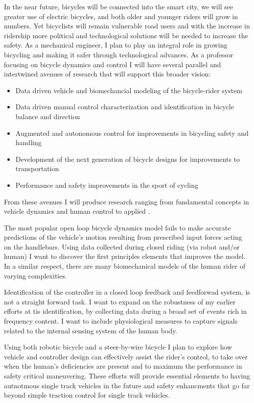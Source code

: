 \documentclass{article}
\begin{document}
In the near future, bicycles will be connected into the smart city, we will see
greater use of electric bicycles, and both older and younger riders will grow
in numbers. Yet bicyclists will remain vulnerable road users and with the
increase in ridership more  political and technological solutions will be
needed to increase the safety. As a mechanical engineer, I plan to play an
integral role in growing bicycling and making it safer through technological
advances. As a professor focusing on bicycle dynamics and control I will have
several parallel and intertwined avenues of research that will support this
broader vision:
%
\begin{itemize}
  \item Data driven vehicle and biomechancial modeling of the bicycle-rider
    system
  \item Data driven manual control characterization and identification in bicycle
    balance and direction
  \item Augmented and autonomous control for improvements in bicycling safety
    and handling
  \item Development of the next generation of bicycle designs for improvements
    to transportation
  \item Performance and safety improvements in the sport of cycling
\end{itemize}

From these avenues I will produce research ranging from fundamental concepts in
vehicle dynamics and human control to applied .

The most popular open loop bicycle dynamics model fails to make accurate
predictions of the vehicle's motion resulting from prescribed input forces
acting on the handlebars. Using data collected during closed riding (via robot
and/or human) I want to discover the first principles elements that improves the
model. In a similar respect, there are many biomechanical models of the human
rider of varying complexities.

Identification of the controller in a closed loop feedback and feedforwad
system, is not a straight forward task. I want to expand on the robustness of
my earlier efforts at tis identification, by collecting data during a broad set
of events rich in frequency content. I want to include physiological measures
to capture signals related to the internal sensing system of the human body.

Using both robotic bicycle and a steer-by-wire bicycle I plan to explore how
vehicle and controller design can effectively assist the rider's control, to
take over when the human's deficiencies are present and to maximum the
performance in safety critical maneuvering. These efforts will provide
essential elements to having autnotmous single track vehicles in the future and
safety enhancments that go far beyond simple traction control for single track
vehicles.
\end{document}
